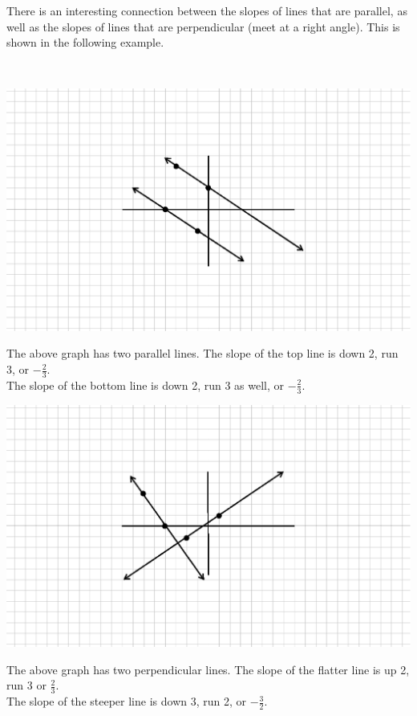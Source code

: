 
 {}\pp

 There is an interesting connection between the slopes of lines that are
parallel, as well as the slopes of lines that are perpendicular (meet at a right
angle). This is shown in the following example.

\begin{example}\label{Lin68}
~\end{example}

  \begin{multicols}{2}
    \includegraphics[scale=.9,bb = 115 65 310 190, clip=true]{II_1_5-1.eps}
    
     The above graph has two parallel lines. The slope of the top line is down
    2, run 3, or $- \frac{2}{3}$.\\
		The slope of the bottom line is down 2, run 3 as well, or $- \frac{2}{3}$.
    
    \includegraphics[scale=.9,bb = 115 65 310 190, clip=true]{II_1_5-2.eps}
    
     The above graph has two perpendicular lines. The slope of the flatter line
    is up 2, run 3 or $\frac{2}{3}$.\\
		The slope of the steeper line is down 3, run 2, or $- \frac{3}{2}$.
  \end{multicols}
~\par

